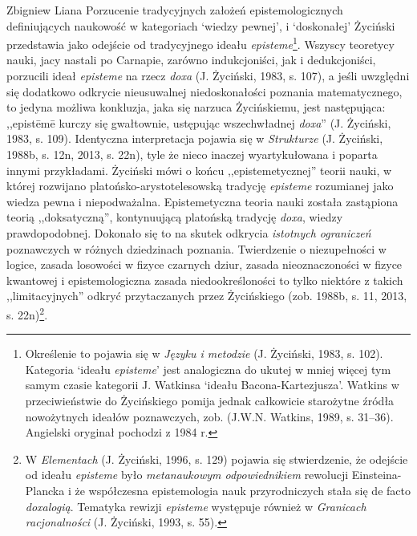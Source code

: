 \begin{artplenv}{Zbigniew Liana}
Porzucenie tradycyjnych założeń epistemologicznych definiujących naukowość w kategoriach `wiedzy pewnej', i `doskonałej'
Życiński przedstawia jako odejście od tradycyjnego ideału \textit{episteme}\footnote{Określenie to pojawia się w \textit{Języku i metodzie}
\label{ref:RNDVZe2UQr77Q}(J. Życiński, 1983, s. 102). Kategoria `ideału\textit{ episteme}' jest
analogiczna do ukutej w mniej więcej tym samym czasie kategorii J. Watkinsa `ideału Bacona-Kartezjusza'. Watkins w przeciwieństwie
do Życińskiego pomija jednak całkowicie starożytne źródła nowożytnych ideałów poznawczych, zob.
\label{ref:RNDFZ4rQltK9B}(J.W.N. Watkins, 1989, s. 31–36). Angielski oryginał pochodzi z 1984 r.}. Wszyscy teoretycy
nauki, jacy nastali po Carnapie, zarówno indukcjoniści, jak i dedukcjoniści, porzucili ideał \textit{episteme }na rzecz
\textit{doxa} \label{ref:RNDFYiS161msr}(J. Życiński, 1983, s. 107), a jeśli uwzględni się dodatkowo odkrycie nieusuwalnej
niedoskonałości poznania matematycznego, to jedyna możliwa konkluzja, jaka się narzuca Życińskiemu, jest następująca:
,,epist\=em\=e kurczy się gwałtownie, ustępując wszechwładnej \textit{doxa}'' \label{ref:RND0ssJjiFTXJ}(J. Życiński, 1983,
s. 109). Identyczna interpretacja pojawia się w \textit{Strukturze} \label{ref:RNDOxi36USGCm}(J. Życiński, 1988b, s. 12n,
2013, s. 22n), tyle że nieco inaczej wyartykułowana i poparta innymi przykładami. Życiński mówi o końcu
,,epistemetycznej'' teorii nauki, w której rozwijano platońsko-arystotelesowską tradycję \textit{episteme} rozumianej jako
wiedza pewna i niepodważalna. Epistemetyczna teoria nauki została zastąpiona teorią ,,doksatyczną'', kontynuującą
platońską tradycję \textit{doxa}, wiedzy prawdopodobnej. Dokonało się to na skutek odkrycia \textit{istotnych ograniczeń}
poznawczych w różnych dziedzinach poznania. Twierdzenie o niezupełności w logice, zasada losowości w fizyce czarnych
dziur, zasada nieoznaczoności w fizyce kwantowej i epistemologiczna zasada niedookreśloności to tylko niektóre z takich
,,limitacyjnych'' odkryć przytaczanych przez Życińskiego \label{ref:RNDP7Ju9f9P3l}(zob. 1988b,
s. 11, 2013, s. 22n)\footnote{W \textit{Elementach} \label{ref:RNDGof4TZDE7e}(J. Życiński, 1996, s. 129) pojawia się stwierdzenie, że
odejście od ideału \textit{episteme} było \textit{metanaukowym odpowiednikiem }rewolucji Einsteina-Plancka i że współczesna
epistemologia nauk przyrodniczych stała się de facto \textit{doxalogią}. Tematyka rewizji \textit{episteme} występuje
również w \textit{Granicach racjonalności} \label{ref:RNDEK9raCkAFp}(J. Życiński, 1993, s. 55).}.


\end{artplenv}
